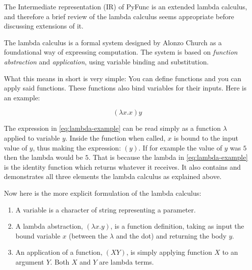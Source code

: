 \documentclass{l4proj}
\begin{document}
The Intermediate representation (IR) of PyFunc is an extended lambda calculus, and therefore a brief review of the lambda calculus seems appropriate before discussing extensions of it.

The lambda calculus is a formal system designed by Alonzo Church\citep{Church_1932} as a foundational way of expressing computation.
The system is based on \emph{function abstraction} and \emph{application}, using variable binding and substitution.

What this means in short is very simple: You can define functions and you can apply said functions.
These functions also bind variables for their inputs.
Here is an example: 

\begin{equation} \label{eq:lambda-example}
    (\lambda x . x) y
\end{equation}

The expression in \ref{eq:lambda-example} can be read simply as a function $\lambda$ applied to variable $y$.
Inside the function when called, $x$ is bound to the input value of $y$, thus making the expression: $(y)$.
If for example the value of $y$ was $5$ then the lambda would be $5$.
That is because the lambda in \ref{eq:lambda-example} is the identity function which returns whatever it receives.
It also contains and demonstrates all three elements the lambda calculus as explained above.

\begin{table}[!h]
\end{table}

Now here is the more explicit formulation of the lambda calculus:
\begin{enumerate}
    \item A variable is a character of string representing a parameter. 
    \item A lambda abstraction, $(\lambda x . y)$, is a function definition, taking as input the bound variable $x$ (between the $\lambda$ and the dot) and returning the body $y$.
    \item An application of a function, $(X Y)$, is simply applying function $X$ to an argument $Y$. Both $X$ and $Y$ are lambda terms.
\end{enumerate}
\end{document}

